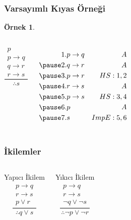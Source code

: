 \documentclass[dvipsnames]{beamer}
\theoremstyle{definition}
\theoremstyle{example}
\newtheorem{ornek}[theorem]{Örnek}
\theoremstyle{plain}
\begin{document}
\begin{frame}
  \frametitle{Varsayımlı Kıyas Örneği}

  \begin{ornek}
    \begin{columns}
      \[
      \frac
        {
          \begin{array}{c}
            p\\
            p \rightarrow q\\
            q \rightarrow r\\
            r \rightarrow s
          \end{array}
        }
        {
          \therefore s
        }
      \]

      \pause
      \begin{eqnarray*}
        1. & p \rightarrow q & A\\
        \pause
        2. & q \rightarrow r & A\\
        \pause
        3. & p \rightarrow r & HS:1,2\\
        \pause
        4. & r \rightarrow s & A\\
        \pause
        5. & p \rightarrow s & HS:3,4\\
        \pause
        6. & p               & A\\
        \pause
        7. & s               & ImpE:5,6
      \end{eqnarray*}
    \end{columns}
  \end{ornek}
\end{frame}

\begin{frame}
  \frametitle{İkilemler}

  \begin{columns}[t]
    \begin{block}{Yapıcı İkilem}
      \[
      \frac
        {
          \begin{array}{c}
            p \rightarrow q\\
            r \rightarrow s\\
            p \vee r
          \end{array}}
        {
          \therefore q \vee s
        }
      \]
    \end{block}

    \pause
    \begin{block}{Yıkıcı İkilem}
      \[
      \frac
        {
          \begin{array}{c}
            p \rightarrow q\\
            r \rightarrow s\\
            \neg q \vee \neg s
          \end{array}
          }
          {
            \therefore \neg p \vee \neg r
          }
      \]
    \end{block}
  \end{columns}
\end{frame}
\end{document}
